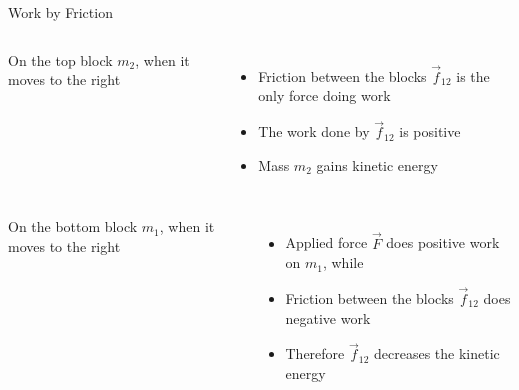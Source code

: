 \documentclass[12pt,compress,aspectratio=169]{beamer}
\begin{document}
\begin{frame}{Work by Friction}
  \begin{columns}
    \centering

    On the top block $m_2$, when it moves to the right
    \begin{itemize}
    \item Friction between the blocks $\vec f_{12}$ is the only force doing work
    \item The work done by $\vec f_{12}$ is positive
    \item Mass $m_2$ gains kinetic energy
    \end{itemize}
  \end{columns}
  \begin{columns}
    On the bottom block $m_1$, when it moves to the right
    \begin{itemize}
    \item Applied force $\vec F$ does positive work on $m_1$, while
    \item Friction between the blocks $\vec f_{12}$ does negative work
    \item Therefore $\vec f_{12}$ decreases the kinetic energy
    \end{itemize}
    
    \centering
  \end{columns}
\end{frame}
\end{document}
